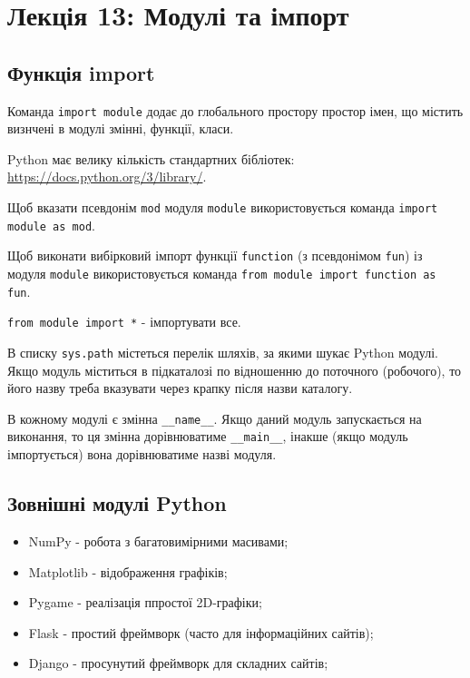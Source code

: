 \section{Лекція 13: Модулі та імпорт}
 
 \subsection{Функція import} 
\begin{frame}
Команда \texttt{import module} додає до глобального простору простор імен, що містить визнчені в модулі змінні, функції, класи. 

Python має велику кількість стандартних бібліотек: \href{https://docs.python.org/3/library/}{https://docs.python.org/3/library/}.

Щоб вказати псевдонім \texttt{mod} модуля \texttt{module} використовується команда \texttt{import module as mod}.

Щоб виконати вибірковий імпорт функції \texttt{function} (з псевдонімом \texttt{fun}) із модуля \texttt{module} використовується команда \texttt{from module import function as fun}.

\texttt{from module import *} - імпортувати все.

\end{frame}

\begin{frame}
В списку \texttt{sys.path} містеться перелік шляхів, за якими шукає Python модулі. Якщо модуль міститься в підкаталозі по відношенню до поточного (робочого), то його назву треба вказувати через крапку після назви каталогу. 

В кожному модулі є змінна \texttt{\_\_name\_\_}. Якщо даний модуль запускається на виконання, то ця змінна дорівнюватиме \texttt{\_\_main\_\_}, інакше (якщо модуль імпортується) вона дорівнюватиме назві модуля.

\end{frame}

\subsection{Зовнішні модулі Python} 
\begin{frame}
\begin{itemize}
  \item NumPy - робота з багатовимірними масивами;
  \item Matplotlib - відображення графіків;
  \item Pygame - реалізація ппростої 2D-графіки;
  \item Flask - простий фреймворк (часто для інформаційних сайтів);
  \item Django - просунутий фреймворк для складних сайтів;
\end{itemize}
\end{frame}
